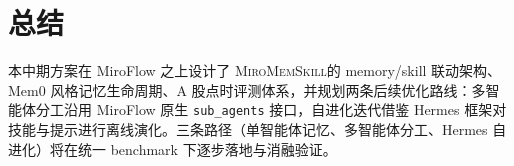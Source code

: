 \documentclass[11pt]{article}
\newcommand{\system}{\textsc{MiroMemSkill}}
\begin{document}
\section{总结}

本中期方案在 MiroFlow 之上设计了 \system 的 memory/skill 联动架构、Mem0 风格记忆生命周期、A 股点时评测体系，并规划两条后续优化路线：多智能体分工沿用 MiroFlow 原生 \texttt{sub\_agents} 接口，自进化迭代借鉴 Hermes 框架对技能与提示进行离线演化。三条路径（单智能体记忆、多智能体分工、Hermes 自进化）将在统一 benchmark 下逐步落地与消融验证。


\end{document}

